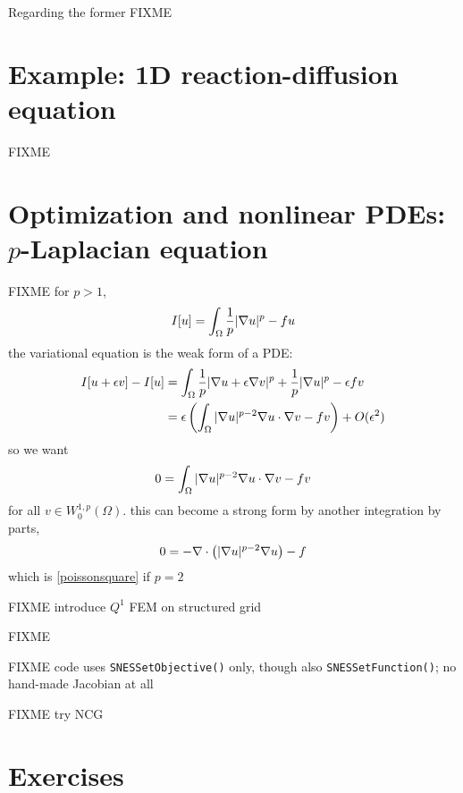 Regarding the former FIXME


\section{Example: 1D reaction-diffusion equation}

FIXME

\vfill
{}



\section{Optimization and nonlinear PDEs: $p$-Laplacian equation}

FIXME for $p>1$,
    $$I[u] = \int_\Omega \frac{1}{p} |\nabla u|^p - fu$$
the variational equation is the weak form of a PDE:
\begin{align*}
I[u+\epsilon v] - I[u] &= \int_\Omega \frac{1}{p} |\nabla u + \epsilon \nabla v|^p + \frac{1}{p} |\nabla u|^p - \epsilon f v \\
   &= \epsilon \left(\int_\Omega |\nabla u|^{p-2} \nabla u \cdot \nabla v - f v\right) + O(\epsilon^2)
\end{align*}
so we want
    $$0 = \int_\Omega |\nabla u|^{p-2} \nabla u \cdot \nabla v - f v$$
for all $v \in W^{1,p}_0(\Omega)$.  this can become a strong form by another integration by parts,
    $$0 = - \nabla\cdot\left(|\nabla u|^{p-2} \nabla u\right) - f$$
which is \eqref{poissonsquare} if $p=2$

FIXME introduce $Q^1$ FEM on structured grid

\begin{marginfigure}

\caption{FIXME}
\label{fig:q1hat}
\end{marginfigure}

FIXME code uses \texttt{SNESSetObjective()} only, though also \texttt{SNESSetFunction()}; no hand-made Jacobian at all

FIXME try NCG


\section{Exercises}


